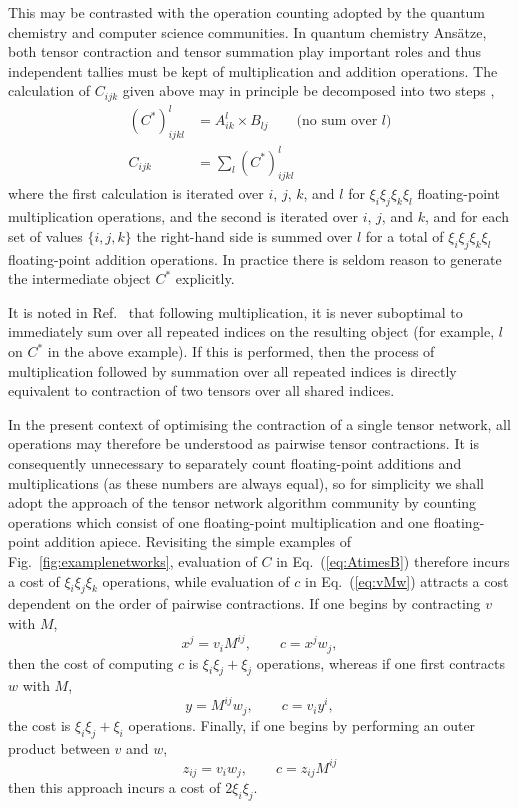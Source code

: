 \documentclass[aps,pre,reprint,superscriptaddress,amsfonts,amsmath,showpacs,nofootinbib,floatfix]{revtex4-1}
\newcommand{\Eref}[1]{Eq.~(\ref{#1})}
\newcommand{\fref}[1]{Fig.~\ref{#1}}
\newcommand{\rcite}[1]{Ref.~\onlinecite{#1}}
\begin{document}
This may be contrasted with the operation counting adopted by the quantum chemistry and computer science communities. In quantum chemistry Ans\"atze, both tensor contraction and tensor summation play important roles and thus independent tallies must be kept of multiplication and addition operations. The calculation of $C_{ijk}$ given above may in principle be decomposed into two steps \cite{lam1997},
\begin{align}
\left(C^*\right)^l_{ijkl} &= A_{ik}^l\times B_{lj}\qquad\textrm{(no sum over $l$)}\label{eq:lunsummed}\\
C_{ijk} &= \sum_l \left(C^*\right)^l_{ijkl}
\end{align}
where the first calculation is iterated over $i$, $j$, $k$, and $l$ for $\xi_i\xi_j\xi_k\xi_l$ floating-point multiplication operations, and the second is iterated over $i$, $j$, and $k$, and for each set of values $\{i,j,k\}$ the right-hand side is summed over $l$ for a total of $\xi_i\xi_j\xi_k\xi_l$ floating-point addition operations. In practice there is seldom reason to generate the intermediate object $C^*$ explicitly.

It is noted in \rcite{lam1997} that following multiplication, it is never suboptimal to immediately sum over all repeated indices on the resulting object (for example, $l$ on $C^*$ in the above example). If this is performed, then the process of multiplication followed by summation over all repeated indices is directly equivalent to contraction of two tensors over all shared indices. 

In the present context of optimising the contraction of a single tensor network, all operations may therefore be understood as pairwise tensor contractions. It is consequently unnecessary to separately count floating-point additions and multiplications (as these numbers are always equal), so for simplicity we shall adopt the approach of the tensor network algorithm community by counting operations which consist of one floating-point multiplication and one floating-point addition apiece. Revisiting the simple examples of \fref{fig:examplenetworks}, evaluation of $C$ in \Eref{eq:AtimesB} therefore incurs a cost of $\xi_i\xi_j\xi_k$ operations, while evaluation of $c$ in \Eref{eq:vMw} attracts a cost dependent on the order of pairwise contractions. If one
begins by contracting $v$ with $M$,
\begin{equation}
x^j=v_iM^{ij},\qquad c=x^jw_j,
\end{equation}
then the cost of computing $c$ is $\xi_i\xi_j+\xi_j$ operations, whereas if one first contracts
$w$ with $M$,
\begin{equation}
y=M^{ij}w_j,\qquad c=v_iy^i,
\end{equation}
the cost is $\xi_i\xi_j+\xi_i$ operations.
Finally, if one begins by performing an outer product between $v$ and $w$,
\begin{equation}
z_{ij}=v_iw_j,\qquad c=z_{ij}M^{ij}
\end{equation}
then this approach incurs a cost of $2\xi_i\xi_j$.
\end{document}
